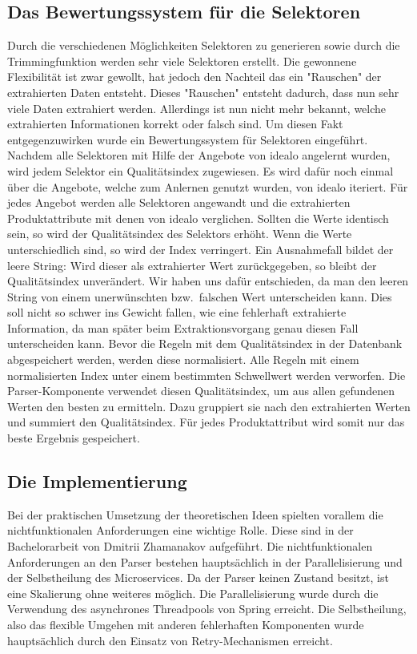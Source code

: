 \subsection{Das Bewertungssystem für die Selektoren}
\label{subsec:bewertungssystem}

Durch die verschiedenen Möglichkeiten Selektoren zu generieren sowie durch die Trimmingfunktion werden sehr viele
Selektoren erstellt.
Die gewonnene Flexibilität ist zwar gewollt, hat jedoch den Nachteil das ein "Rauschen" der extrahierten Daten entsteht.
Dieses "Rauschen" entsteht dadurch, dass nun sehr viele Daten extrahiert werden.
Allerdings ist nun nicht mehr bekannt, welche extrahierten Informationen korrekt oder falsch sind.
Um diesen Fakt entgegenzuwirken wurde ein Bewertungssystem für Selektoren eingeführt.
Nachdem alle Selektoren mit Hilfe der Angebote von idealo angelernt wurden, wird jedem Selektor ein Qualitätsindex
zugewiesen.
Es wird dafür noch einmal über die Angebote, welche zum Anlernen genutzt wurden, von idealo iteriert.
Für jedes Angebot werden alle Selektoren angewandt und die extrahierten Produktattribute mit denen von idealo
verglichen.
Sollten die Werte identisch sein, so wird der Qualitätsindex des Selektors erhöht.
Wenn die Werte unterschiedlich sind, so wird der Index verringert.
Ein Ausnahmefall bildet der leere String: Wird dieser als extrahierter Wert zurückgegeben, so bleibt der
Qualitätsindex unverändert.
Wir haben uns dafür entschieden, da man den leeren String von einem unerwünschten bzw.\  falschen Wert unterscheiden
kann.
Dies soll nicht so schwer ins Gewicht fallen, wie eine fehlerhaft extrahierte Information, da man später beim
Extraktionsvorgang genau diesen Fall unterscheiden kann.
Bevor die Regeln mit dem Qualitätsindex in der Datenbank abgespeichert werden, werden diese normalisiert.
Alle Regeln mit einem normalisierten Index unter einem bestimmten Schwellwert werden verworfen.
Die Parser-Komponente verwendet diesen Qualitätsindex, um aus allen gefundenen Werten den besten zu ermitteln.
Dazu gruppiert sie nach den extrahierten Werten und summiert den Qualitätsindex.
Für jedes Produktattribut wird somit nur das beste Ergebnis gespeichert.

\subsection{Die Implementierung}
\label{subsec:implementierung}

Bei der praktischen Umsetzung der theoretischen Ideen spielten vorallem die nichtfunktionalen Anforderungen eine
wichtige Rolle.
Diese sind in der Bachelorarbeit von Dmitrii Zhamanakov aufgeführt.
Die nichtfunktionalen Anforderungen an den Parser bestehen hauptsächlich in der Parallelisierung und der
Selbstheilung des Microservices.
Da der Parser keinen Zustand besitzt, ist eine Skalierung ohne weiteres möglich.
Die Parallelisierung wurde durch die Verwendung des asynchrones Threadpools von Spring erreicht.
Die Selbstheilung, also das flexible Umgehen mit anderen fehlerhaften Komponenten wurde hauptsächlich durch den
Einsatz von Retry-Mechanismen erreicht.

